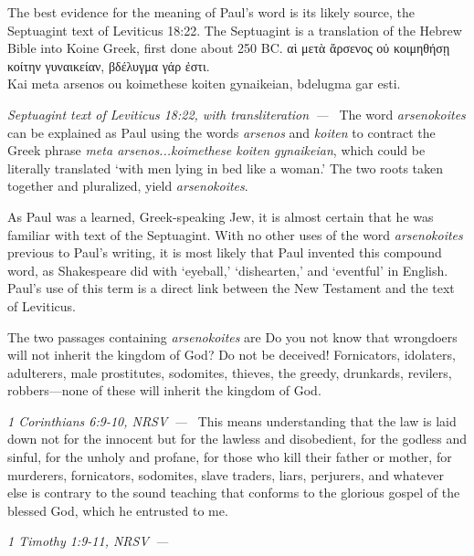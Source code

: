 \documentclass[10pt]{article}
\let\oldquote\quote
\let\endoldquote\endquote
\renewenvironment{quote}[2][]
  {\if\relax\detokenize{#1}\relax
     \def\quoteauthor{#2}%
   \else
     \def\quoteauthor{#2~---~#1}%
   \fi
   \oldquote}
  {\par\nobreak\smallskip\hfill\textit{\quoteauthor}%
   \endoldquote\addvspace{\bigskipamount}}
\begin{document}
The best evidence for the meaning of Paul's word is its likely source, the Septuagint text of Leviticus 18:22. The Septuagint is a translation of the Hebrew Bible into Koine Greek, first done about 250 BC.
\begin{quote}{Septuagint text of Leviticus 18:22, with transliteration}
{\textgreekfont \textKappa αὶ μετὰ ἄρσενος οὐ κοιμηθήσῃ κοίτην γυναικείαν, βδέλυγμα γάρ ἐστι.}\\Kai meta arsenos ou koimethese koiten gynaikeian, bdelugma gar esti.
\end{quote}
The word \textit{arsenokoites} can be explained as Paul using the words \textit{arsenos}  and \textit{koiten} to contract the Greek phrase \textit{meta arsenos...koimethese koiten gynaikeian}, which could be literally translated `with men lying in bed like a woman.' The two roots taken together and pluralized, yield \textit{arsenokoites}. 

As Paul was a learned, Greek-speaking Jew, it is almost certain that he was familiar with text of the Septuagint. With no other uses of the word \textit{arsenokoites} previous to Paul's writing, it is most likely that Paul invented this compound word, as Shakespeare did with `eyeball,' `dishearten,' and `eventful' in English. Paul's use of this term is a direct link between the New Testament and the text of Leviticus. 

The two passages containing \textit{arsenokoites} are 
\begin{quote}{1 Corinthians 6:9-10, NRSV}
Do you not know that wrongdoers will not inherit the kingdom of God? Do not be deceived! Fornicators, idolaters, adulterers, male prostitutes, sodomites, thieves, the greedy, drunkards, revilers, robbers—none of these will inherit the kingdom of God. 
\end{quote}
\begin{quote}{1 Timothy 1:9-11, NRSV}
This means understanding that the law is laid down not for the innocent but for the lawless and disobedient, for the godless and sinful, for the unholy and profane, for those who kill their father or mother, for murderers, fornicators, sodomites, slave traders, liars, perjurers, and whatever else is contrary to the sound teaching that conforms to the glorious gospel of the blessed God, which he entrusted to me.
\end{quote}
\end{document}
